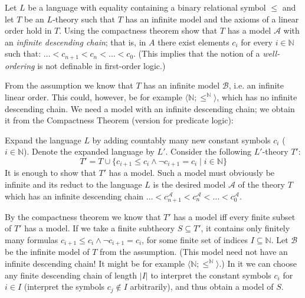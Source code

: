 \begin{problem} 
    
    Let $L$ be a language with equality containing a binary relational symbol $\le$ and let $T$ be an $L$-theory such that $T$ has an infinite model and the axioms of a linear order hold in $T$. Using the compactness theorem show that $T$ has a model $\mathcal{A}$ with an \emph{infinite descending chain}; that is, in $A$ there exist elements $c_i$ for every $i\in \mathbb{N}$ such that: $\dots < c_{n+1} < c_n< \dots <c_0$.
    (This implies that the notion of a \emph{well-ordering} is not definable in first-order logic.)

    \begin{solution}

        From the assumption we know that $T$ has an infinite model $\mathcal B$, i.e. an infinite linear order. This could, however, be for example $\langle \mathbb N;\leq^\mathbb N\rangle$, which has no infinite descending chain. We need a model with an infinite descending chain; we obtain it from the Compactness Theorem (version for predicate logic):
                
        Expand the language $L$ by adding countably many new constant symbols $c_i$ ($i\in\mathbb{N}$). Denote the expanded language by $L'$. Consider the following $L'$-theory $T'$:
        $$
        T' = T \cup \{c_{i+1}\leq c_i\land\neg c_{i+1}=c_i\mid i\in\mathbb{N}\}
        $$
        It is enough to show that $T'$ has a model. Such a model must obviously be infinite and its reduct to the language $L$ is the desired model $\mathcal A$ of the theory $T$ which has an infinite descending chain $\dots < c_{n+1}^\mathcal A < c_n^\mathcal A < \dots < c_0^\mathcal A$. 
        
        By the compactness theorem we know that $T'$ has a model iff every finite subset of $T'$ has a model. If we take a finite subtheory $S\subseteq T'$, it contains only finitely many formulas $c_{i+1}\leq c_i\land\neg c_{i+1}=c_i$, for some finite set of indices $I\subseteq\mathbb N$. Let $\mathcal B$ be the infinite model of $T$ from the assumption. (This model need not have an infinite descending chain! It might be for example $\langle \mathbb N;\leq^\mathbb N\rangle$.) In it we can choose any finite descending chain of length $|I|$ to interpret the constant symbols $c_i$ for $i\in I$ (interpret the symbols $c_j\notin I$ arbitrarily), and thus obtain a model of $S$.
                    
    \end{solution}

\end{problem}


